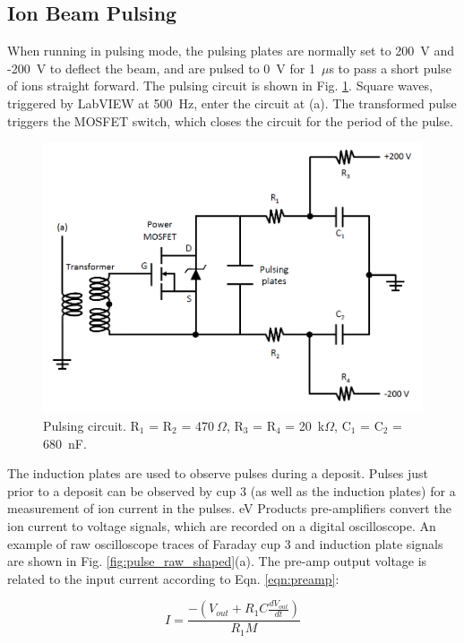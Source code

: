 \subsection{Ion Beam Pulsing}

When running in pulsing mode, the pulsing plates are normally set to 200~V and -200~V to deflect the beam, and are pulsed to 0~V for 1~$\mu$s to pass a short pulse of ions straight forward.  The pulsing circuit is shown in Fig. \ref{fig:pulse_circuit}.  Square waves, triggered by LabVIEW at 500~Hz, enter the circuit at (a). The transformed pulse triggers the MOSFET switch, which closes the circuit for the period of the pulse.

\begin{figure} %
        \centering
                \includegraphics[width=.85\textwidth]{figures/pulsing_circuit.png}
                \caption{Pulsing circuit.  R$_{1}$ = R$_{2}$ = $470~\Omega$, R$_{3}$ = R$_{4}$ = 20~k$\Omega$, \newline C$_{1}$ = C$_{2}$ = 680~nF. \cite{Shon}}
\label{fig:pulse_circuit}
\end{figure}

The induction plates are used to observe pulses during a deposit.  Pulses just prior to a deposit can be observed by cup 3 (as well as the induction plates) for a measurement of ion current in the pulses.  eV Products pre-amplifiers convert the ion current to voltage signals, which are recorded on a digital oscilloscope.  An example of raw oscilloscope traces of Faraday cup 3 and induction plate signals are shown in Fig. \ref{fig:pulse_raw_shaped}(a).  The pre-amp output voltage is related to the input current according to Eqn. \ref{eqn:preamp}:

\begin{equation}
I = \frac{-(V_{out} + R_{1} C \frac{dV_{out}}{dt})}{R_{1} M}
\label{eqn:preamp}
\end{equation}

